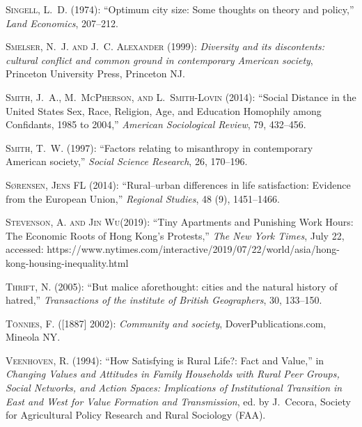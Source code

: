 \documentclass[11pt, letterpaper]{article}
\begin{document}
\begin{spacing}{1.4}
\begin{thebibliography}{92}
\textsc{Singell, L.~D.} (1974): \enquote{Optimum city size: Some thoughts on
  theory and policy,} \emph{Land Economics}, 207--212.

\textsc{Smelser, N.~J. and J.~C. Alexander} (1999): \emph{Diversity and its
  discontents: cultural conflict and common ground in contemporary American
  society}, Princeton University Press, Princeton NJ.

\textsc{Smith, J.~A., M.~McPherson, and L.~Smith-Lovin} (2014): \enquote{Social
  Distance in the United States Sex, Race, Religion, Age, and Education
  Homophily among Confidants, 1985 to 2004,} \emph{American Sociological
  Review}, 79, 432--456.

\textsc{Smith, T.~W.} (1997): \enquote{Factors relating to misanthropy in
  contemporary American society,} \emph{Social Science Research}, 26, 170--196.
  
\textsc{S{\o}rensen, Jens FL} (2014): \enquote{Rural--urban differences in life satisfaction: Evidence from the European Union,} \emph{Regional Studies}, 48 (9), 1451--1466.

\textsc{Stevenson, A. and Jin Wu}(2019): \enquote{Tiny Apartments and Punishing Work Hours: The Economic Roots of Hong Kong's Protests,} \emph{The New York Times}, July 22, accessed: https://www.nytimes.com/interactive/2019/07/22/world/asia/hong-kong-housing-inequality.html

    
\textsc{Thrift, N.} (2005): \enquote{But malice aforethought: cities and the
  natural history of hatred,} \emph{Transactions of the institute of British
  Geographers}, 30, 133--150.

\textsc{T{\"o}nnies, F.} ([1887] 2002): \emph{Community and society},
  DoverPublications.com, Mineola NY.

\textsc{Veenhoven, R.} (1994): \enquote{How Satisfying is Rural Life?: Fact and
  Value,} in \emph{Changing Values and Attitudes in Family Households with
  Rural Peer Groups, Social Networks, and Action Spaces: Implications of
  Institutional Transition in East and West for Value Formation and
  Transmission}, ed. by J.~Cecora, Society for Agricultural Policy Research and
  Rural Sociology (FAA).


\end{thebibliography}
\end{spacing}
\end{document}
